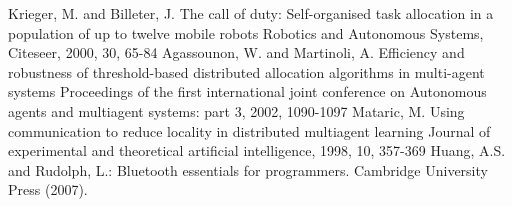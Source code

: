 \documentclass[letterpaper, 10 pt, conference]{ieeeconf}  %
\begin{document}
\begin{thebibliography}{99}
Krieger, M. and Billeter, J. The call of duty: Self-organised task allocation in a population of up to twelve mobile robots Robotics and Autonomous Systems, Citeseer, 2000, 30, 65-84
Agassounon, W. and Martinoli, A. Efficiency and robustness of threshold-based distributed allocation algorithms in multi-agent systems Proceedings of the first international joint conference on Autonomous agents and multiagent systems: part 3, 2002, 1090-1097
Mataric, M. Using communication to reduce locality in distributed multiagent learning Journal of experimental and theoretical artificial intelligence, 1998, 10, 357-369
Huang, A.S. and Rudolph, L.:
Bluetooth essentials for programmers.
Cambridge University Press (2007).

%
%

\end{thebibliography}
\end{document}
